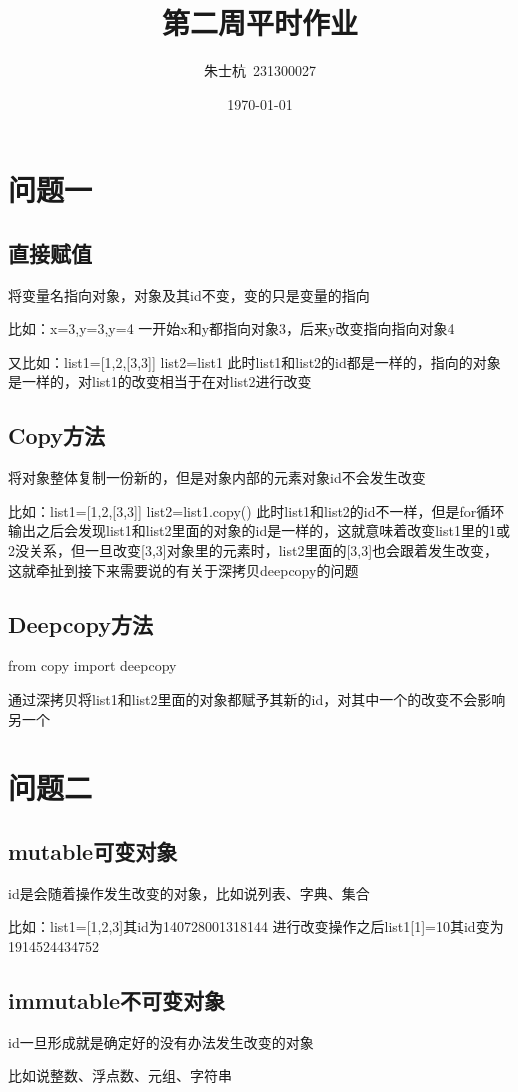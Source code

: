 \documentclass[10pt]{article}
\title{第二周平时作业}
\author{朱士杭\ 231300027}
\date{\kaishu \today}
\begin{document}
	\maketitle
\section{问题一}
	\subsection{直接赋值}
	将变量名指向对象，对象及其id不变，变的只是变量的指向\par
	比如：x=3,y=3,y=4  一开始x和y都指向对象3，后来y改变指向指向对象4\par
	又比如：list1=[1,2,[3,3]]  list2=list1  此时list1和list2的id都是一样的，指向的对象是一样的，对list1的改变相当于在对list2进行改变
	\subsection{Copy方法}
	将对象整体复制一份新的，但是对象内部的元素对象id不会发生改变\par
	比如：list1=[1,2,[3,3]]  list2=list1.copy()  此时list1和list2的id不一样，但是for循环输出之后会发现list1和list2里面的对象的id是一样的，这就意味着改变list1里的1或2没关系，但一旦改变[3,3]对象里的元素时，list2里面的[3,3]也会跟着发生改变，这就牵扯到接下来需要说的有关于深拷贝deepcopy的问题
	\subsection{Deepcopy方法}
	from copy import deepcopy\par
	通过深拷贝将list1和list2里面的对象都赋予其新的id，对其中一个的改变不会影响另一个

\section{问题二}	
	\subsection{mutable可变对象}
	id是会随着操作发生改变的对象，比如说列表、字典、集合\par
	比如：list1=[1,2,3]其id为140728001318144  进行改变操作之后list1[1]=10其id变为1914524434752
	\subsection{immutable不可变对象}
	id一旦形成就是确定好的没有办法发生改变的对象\par
	比如说整数、浮点数、元组、字符串
\end{document}

